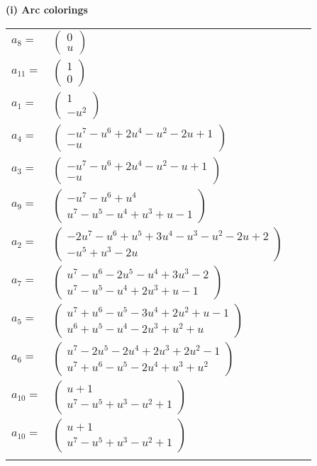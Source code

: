 \documentclass[1p]{elsarticle_modified}
\theoremstyle{definition}
\begin{document}
\flushleft \textbf{(i) Arc colorings}\\
\begin{tabular}{m{7pt} m{180pt} m{7pt} m{180pt} }
\flushright $a_{8}=$&$\begin{pmatrix}0\\u\end{pmatrix}$ \\
\flushright $a_{11}=$&$\begin{pmatrix}1\\0\end{pmatrix}$ \\
\flushright $a_{1}=$&$\begin{pmatrix}1\\- u^2\end{pmatrix}$ \\
\flushright $a_{4}=$&$\begin{pmatrix}- u^7- u^6+2 u^4- u^2-2 u+1\\- u\end{pmatrix}$ \\
\flushright $a_{3}=$&$\begin{pmatrix}- u^7- u^6+2 u^4- u^2- u+1\\- u\end{pmatrix}$ \\
\flushright $a_{9}=$&$\begin{pmatrix}- u^7- u^6+u^4\\u^7- u^5- u^4+u^3+u-1\end{pmatrix}$ \\
\flushright $a_{2}=$&$\begin{pmatrix}-2 u^7- u^6+u^5+3 u^4- u^3- u^2-2 u+2\\- u^5+u^3-2 u\end{pmatrix}$ \\
\flushright $a_{7}=$&$\begin{pmatrix}u^7- u^6-2 u^5- u^4+3 u^3-2\\u^7- u^5- u^4+2 u^3+u-1\end{pmatrix}$ \\
\flushright $a_{5}=$&$\begin{pmatrix}u^7+u^6- u^5-3 u^4+2 u^2+u-1\\u^6+u^5- u^4-2 u^3+u^2+u\end{pmatrix}$ \\
\flushright $a_{6}=$&$\begin{pmatrix}u^7-2 u^5-2 u^4+2 u^3+2 u^2-1\\u^7+u^6- u^5-2 u^4+u^3+u^2\end{pmatrix}$ \\
\flushright $a_{10}=$&$\begin{pmatrix}u+1\\u^7- u^5+u^3- u^2+1\end{pmatrix}$\\ \flushright $a_{10}=$&$\begin{pmatrix}u+1\\u^7- u^5+u^3- u^2+1\end{pmatrix}$\\&\end{tabular}
\end{document}
